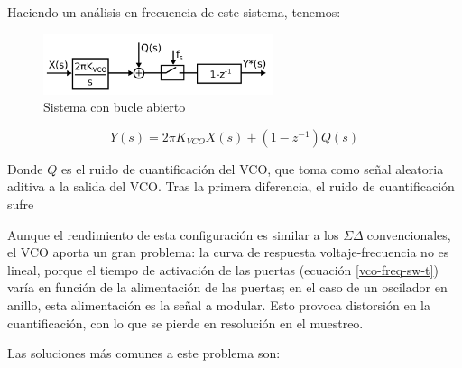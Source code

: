\documentclass[12pt]{report} %
\newcommand{\sigmadelta}{$\Sigma\Delta\; $}
\begin{document}
	Haciendo un análisis en frecuencia de este sistema, tenemos:
	\begin{figure}[H]
		\includegraphics[width=0.6\textwidth]{vco-adc-open-loop-lp.png}
		\caption[Sistema con bucle abierto]{Sistema con bucle abierto\protect\footnotemark} %
		\label{fig:vco-adc-open-loop-lp.png}
	\end{figure}
	
	\begin{figure}[h]
		\begin{equation}
		\label{vco-open-loop-laplace}
		Y(s)=2\pi K_{VCO}X(s) + (1 - z^{-1})Q(s)
		\end{equation}
	\end{figure}
	
	Donde $Q$ es el ruido de cuantificación del VCO, que toma como señal aleatoria aditiva a la salida del VCO. Tras la primera diferencia, el ruido de cuantificación sufre %
	
	Aunque el rendimiento de esta configuración es similar a los \sigmadelta convencionales, el VCO aporta un gran problema: la curva de respuesta voltaje-frecuencia no es lineal, porque el tiempo de activación de las puertas (ecuación \ref{vco-freq-sw-t}) varía en función de la alimentación de las puertas; en el caso de un oscilador en anillo, esta alimentación es la señal a modular. Esto provoca distorsión en la cuantificación, con lo que se pierde en resolución en el muestreo.
	
	Las soluciones más comunes a este problema son:
	
\end{document}
